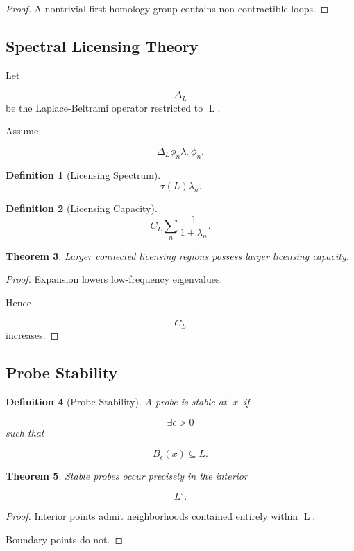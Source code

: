 \documentclass[12pt]{article}
\newtheorem{theorem}{Theorem}[section]
\newtheorem{definition}[theorem]{Definition}
\theoremstyle{remark}
\begin{document}
\begin{proof}
A nontrivial first homology group contains non-contractible loops.
\end{proof}

\subsection{Spectral Licensing Theory}

Let

\[
\Delta_L
\]
be the Laplace-Beltrami operator restricted to L.

Assume

\[
\Delta_L\phi_n
\lambda_n\phi_n.
\]

\begin{definition}[Licensing Spectrum]
\[
\sigma(L)
{\lambda_n}.
\]
\end{definition}

\begin{definition}[Licensing Capacity]
\[
C_L
\sum_n
\frac1{1+\lambda_n}.
\]
\end{definition}

\begin{theorem}
Larger connected licensing regions possess larger licensing capacity.
\end{theorem}

\begin{proof}
Expansion lowers low-frequency eigenvalues.

Hence

\[
C_L
\]
increases.
\end{proof}

\subsection{Probe Stability}

\begin{definition}[Probe Stability]
A probe is stable at x if

\[
\exists \epsilon>0
\]
such that

\[
B_\epsilon(x)
\subseteq L.
\]
\end{definition}
\begin{theorem}
Stable probes occur precisely in the interior

\[
L^\circ.
\]
\end{theorem}
\begin{proof}
Interior points admit neighborhoods contained entirely within L.

Boundary points do not.
\end{proof}
\end{document}
